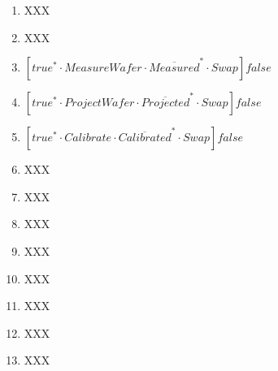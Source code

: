 \begin{enumerate}
    \item XXX
    \item XXX
    \item $[true^{*}\cdot MeasureWafer\cdot \overline{Measured}^{*}\cdot Swap]false$
    \item $[true^{*}\cdot ProjectWafer\cdot \overline{Projected}^{*}\cdot Swap]false$
    \item $[true^{*}\cdot Calibrate\cdot \overline{Calibrated}^{*}\cdot Swap]false$
    \item XXX
    \item XXX
    \item XXX
    \item XXX
    \item XXX
    \item XXX
    \item XXX
    \item XXX
\end{enumerate}